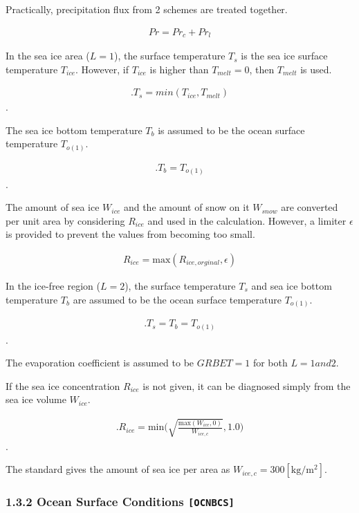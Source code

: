 Practically, precipitation flux from 2 schemes are treated together.

\begin{eqnarray}
    Pr = Pr_c + Pr_l
\end{eqnarray}

In the sea ice area (\(L=1\)), the surface temperature \(T_s\) is the
sea ice surface temperature \(T_{ice}\). However, if \(T_{ice}\) is
higher than \(T_{melt}=0\), then \(T_{melt}\) is used.

\begin{eqnarray}.
    T_s = min(T_{ice},T_{melt})
\end{eqnarray}.

The sea ice bottom temperature \(T_b\) is assumed to be the ocean
surface temperature \(T_{o(1)}\).

\begin{eqnarray}.
    T_b = T_{o(1)}
\end{eqnarray}.

The amount of sea ice \(W_{ice}\) and the amount of snow on it
\(W_{snow}\) are converted per unit area by considering \(R_{ice}\) and
used in the calculation. However, a limiter \(\epsilon\) is provided to
prevent the values from becoming too small.

\begin{eqnarray}
R_{ice} =\mathrm{max}( R_{ice,orginal}, \epsilon)
\end{eqnarray}

In the ice-free region (\(L=2\)), the surface temperature \(T_s\) and
sea ice bottom temperature \(T_b\) are assumed to be the ocean surface
temperature \(T_{o(1)}\).

\begin{eqnarray}.
    T_s = T_b = T_{o(1)}
\end{eqnarray}.

The evaporation coefficient is assumed to be \(GRBET=1\) for both
\(L=1 and 2\).

If the sea ice concentration \(R_{ice}\) is not given, it can be
diagnosed simply from the sea ice volume \(W_{ice}\).

\begin{eqnarray}.
R_{ice} = \mathrm{min}\Big(\sqrt{\frac{\mathrm{max}(W_{ice},0)}{W_{ice,c}}},1.0\Big)
\end{eqnarray}.

The standard gives the amount of sea ice per area as
\(W_{ice,c}=300 \mathrm{[kg/m^2]}\).

\hypertarget{ocean-surface-conditions-ocnbcs}{%
\subsubsection{\texorpdfstring{1.3.2 Ocean Surface Conditions
\texttt{{[}OCNBCS{]}}}{1.3.2 Ocean Surface Conditions {[}OCNBCS{]}}}\label{ocean-surface-conditions-ocnbcs}}

